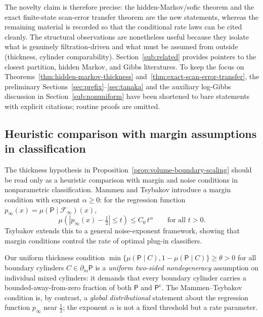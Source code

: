 The novelty claim is therefore precise: the hidden-Markov/sofic theorem and
the exact finite-state scan-error transfer theorem are the new statements,
whereas the remaining material is recorded so that the conditional rate laws
can be cited cleanly.  The structural observations are
nonetheless useful because they isolate what is genuinely filtration-driven
and what must be assumed from outside (thickness, cylinder comparability).
Section~\ref{sub:related} provides pointers to the closest partition, hidden
Markov, and Gibbs literatures.
To keep the focus on Theorems~\ref{thm:hidden-markov-thickness}
and~\ref{thm:exact-scan-error-transfer}, the
preliminary Sections~\ref{sec:prefix}--\ref{sec:tanaka} and the auxiliary
log-Gibbs discussion in Section~\ref{sub:nonuniform} have been shortened to
bare statements with explicit citations; routine proofs are omitted.

\subsection{Heuristic comparison with margin assumptions in classification}
\label{sub:margin}

The thickness hypothesis in Proposition~\ref{prop:volume-boundary-scaling}
should be read only as a heuristic comparison with margin and noise conditions
in nonparametric classification.
Mammen and Tsybakov \cite{MammenTsybakov1999} introduce a margin condition
with exponent $\alpha\ge 0$: for the regression function
$p_\infty(x)=\mu(\mathsf{P}\mid\mathcal{F}_\infty)(x)$,
\[
\mu\!\left(\left|p_\infty(x)-\tfrac12\right|\le t\right)\le C_0\,t^\alpha
\qquad\text{for all }t>0.
\]
Tsybakov \cite{Tsybakov2004} extends this to a general noise-exponent
framework, showing that margin conditions control the rate of optimal
plug-in classifiers.

Our uniform thickness condition
$\min\{\mu(\mathsf{P}\mid C),1-\mu(\mathsf{P}\mid C)\}\ge\theta>0$ for all
boundary cylinders $C\in\partial_m\mathsf{P}$ is a \emph{uniform two-sided
nondegeneracy} assumption on individual mixed cylinders: it demands that
every boundary cylinder carries a bounded-away-from-zero fraction of
both $\mathsf{P}$ and $\mathsf{P}^c$.  The Mammen--Tsybakov condition is,
by contrast, a \emph{global distributional} statement about the regression
function $p_\infty$ near $\frac12$; the exponent $\alpha$ is not a fixed
threshold but a rate parameter.

